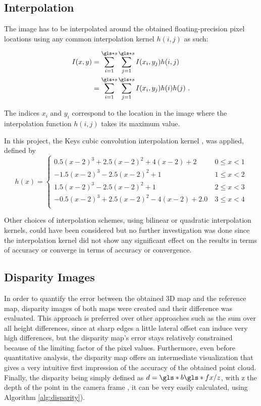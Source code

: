 \subsection{Interpolation}

The image has to be interpolated around the obtained floating-precision pixel
locations using any common interpolation kernel $h(i, j)$ as such:

\begin{align}
  I(x, y) &= \summ{i}{s} \summ{j}{s} I(x_i, y_j) h(i, j) \\
  &= \summ{i}{s} \summ{j}{s} I(x_i, y_j) h(i) h(j) \text{ .}
  \label{eq:basics:interpolation}
\end{align}

The indices $x_i$ and $y_i$ correspond to the location in the image where the
interpolation function $h(i, j)$ takes its maximum value.

In this project, the Keys cubic convolution interpolation kernel \cite{Keys1981}, 
was applied, defined by
\begin{equation}
  h(x) = 
  \begin{cases}
     0.5(x - 2)^3 + 2.5(x-2)^2+4(x-2) + 2 & \ 0 \leq x < 1 \\
     -1.5(x-2)^3 - 2.5(x-2)^2 + 1 & \ 1 \leq x < 2 \\
     1.5(x-2)^3 - 2.5(x-2)^2 + 1 & \ 2 \leq x < 3 \\
     -0.5(x -2)^3 + 2.5(x-2)^2 - 4(x-2) + 2.0 & \ 3 \leq x < 4 \\
  \end{cases}
  \label{eq:cubicinterpolation}
\end{equation}

Other choices of interpolation schemes, using bilinear or quadratic
interpolation kernels, could have been considered but no further investigation 
was done since the interpolation kernel did not show any 
significant effect on the results in terms of accuracy or converge in terms of
accuracy or convergence.

\subsection{Disparity Images} 

In order to quantify the error between the obtained 3D map and the reference
map, disparity images of both maps were created and their difference was evaluated. 
This approach is preferred over other approaches such as the sum over all height
differences, since at sharp edges a little lateral offset can induce very
high differences, but the disparity map's error stays relatively constrained
because of the limiting factor of the pixel values. Furthermore, even before
quantitative analysis, the disparity map 
offers an intermediate visualization that gives a very intuitive first impression of the accuracy of the obtained point cloud.
Finally, the disparity being simply defined as $d = \g{b} \g{fx} / z$, with z the depth of the
point in the camera frame , it can be very easily calculated,
using Algorithm \ref{alg:disparity}).

